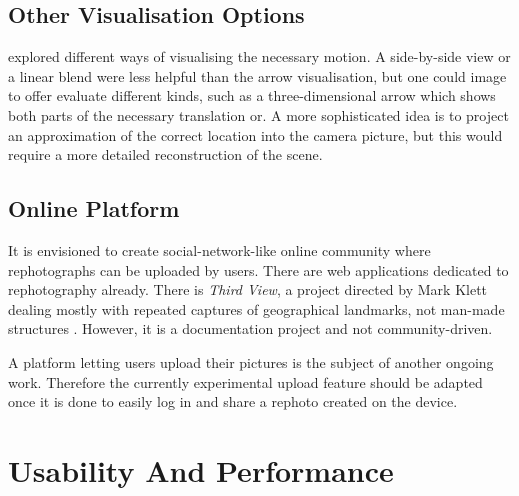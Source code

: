 \subsection{Other Visualisation Options}\label{subsec:alternative_visualisation}

\citet{bae2010} explored different ways of visualising the necessary motion.
A side-by-side view or a linear blend were less helpful than the arrow
visualisation, but one could image to offer evaluate different kinds, such as
a three-dimensional arrow which shows both parts of the necessary translation
or. A more sophisticated idea is to project an approximation of the correct
location into the camera picture, but this would require a more detailed
reconstruction of the scene.

\subsection{Online Platform}

It is envisioned to create social-network-like online community where
rephotographs can be uploaded by users.
There are web applications dedicated to rephotography already. There is
\emph{Third View}, a project directed by Mark Klett dealing mostly with repeated
captures of geographical landmarks, not man-made structures \citep{thirdview}. However, it is a documentation
project and not community-driven.

A platform letting users upload their pictures is the subject of another ongoing work. Therefore the currently
experimental upload feature should be adapted once it is done to easily log in
and share a rephoto created on the device.

\section{Usability And Performance}

